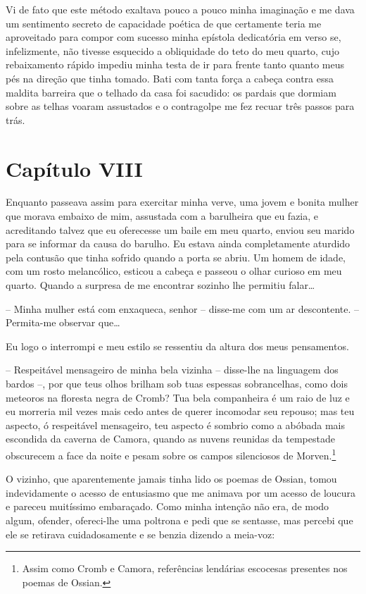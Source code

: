  Vi de fato que este método exaltava pouco a pouco minha imaginação e me
dava um sentimento secreto de capacidade poética de que certamente
teria me aproveitado para compor com sucesso minha epístola dedicatória em
verso se, infelizmente, não tivesse esquecido a obliquidade do teto do
meu quarto, cujo rebaixamento rápido impediu minha testa de ir para
frente tanto quanto meus pés na direção que tinha tomado. Bati com
tanta força a cabeça contra essa maldita barreira que o telhado da casa
foi sacudido: os pardais que dormiam sobre as telhas voaram assustados
e o contragolpe me fez recuar três passos para trás.

\section*{Capítulo VIII}

 Enquanto passeava assim para exercitar minha verve, uma jovem e bonita
mulher que morava embaixo de mim, assustada com a barulheira que eu
fazia, e acreditando talvez que eu oferecesse um baile em meu quarto,
enviou seu marido para se informar da causa do barulho. Eu estava ainda
completamente aturdido pela contusão que tinha sofrido quando a porta
se abriu. Um homem de idade, com um rosto melancólico, esticou a cabeça
e passeou o olhar curioso em meu quarto. Quando a surpresa de me
encontrar sozinho lhe permitiu falar\ldots

-- Minha mulher está com enxaqueca, senhor -- disse-me com um ar
descontente. -- Permita-me observar que\ldots

Eu logo o interrompi e meu estilo se ressentiu da altura dos meus
pensamentos. 

-- Respeitável mensageiro de minha bela vizinha -- disse-lhe na
linguagem dos bardos --, por que teus olhos brilham sob tuas espessas
sobrancelhas, como dois meteoros na floresta negra de Cromb? Tua bela
companheira é um raio de luz e eu morreria mil vezes mais cedo antes de
querer incomodar seu repouso; mas teu aspecto, ó respeitável
mensageiro, teu aspecto é sombrio como a abóbada mais escondida da
caverna de Camora, quando as nuvens reunidas da tempestade obscurecem a
face da noite e pesam sobre os campos silenciosos de Morven.\footnote{ Assim 
como Cromb e Camora, referências lendárias escocesas presentes
nos poemas de Ossian.}

O vizinho, que aparentemente jamais tinha lido os poemas de Ossian,
tomou indevidamente o acesso de entusiasmo que me animava por um acesso
de loucura e pareceu muitíssimo embaraçado. Como minha intenção não
era, de modo algum, ofender, ofereci-lhe uma poltrona e pedi que se
sentasse, mas percebi que ele se retirava cuidadosamente e se benzia
dizendo a meia-voz: 

